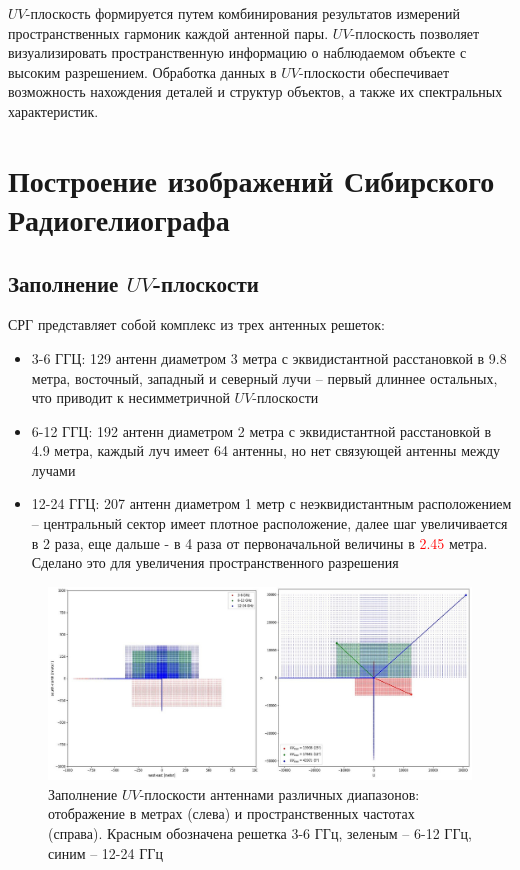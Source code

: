 $UV$-плоскость формируется путем комбинирования результатов измерений пространственных гармоник каждой антенной пары. $UV$-плоскость позволяет визуализировать пространственную информацию о наблюдаемом объекте с высоким разрешением. Обработка данных в $UV$-плоскости обеспечивает возможность нахождения деталей и структур объектов, а также их спектральных характеристик.

\section{Построение изображений Сибирского Радиогелиографа}
\subsection{Заполнение $UV$-плоскости}
СРГ представляет собой комплекс из трех антенных решеток:
\begin{itemize}
	\item 3-6 ГГЦ: 129 антенн диаметром 3 метра с эквидистантной расстановкой в 9.8 метра, восточный, западный и северный лучи -- первый длиннее остальных, что приводит к несимметричной $UV$-плоскости
	\item 6-12 ГГЦ: 192 антенн диаметром 2 метра с эквидистантной расстановкой в 4.9 метра, каждый луч имеет 64 антенны, но нет связующей антенны между лучами
	\item 12-24 ГГЦ: 207 антенн диаметром 1 метр с неэквидистантным расположением -- центральный сектор имеет плотное расположение, далее шаг увеличивается в 2 раза, еще дальше - в 4 раза от первоначальной величины в \textcolor{red}{2.45} метра. Сделано это для увеличения пространственного разрешения
\end{itemize}

\begin{figure}[H]
	\centering
	\includegraphics[scale=0.28]{images/srh_UV}
	\caption{Заполнение $UV$-плоскости антеннами различных диапазонов: отображение в метрах (слева) и пространственных частотах (справа). Красным обозначена решетка 3-6 ГГц, зеленым -- 6-12 ГГц, синим -- 12-24 ГГц}
	\label{fig:srh_UV}
\end{figure}

